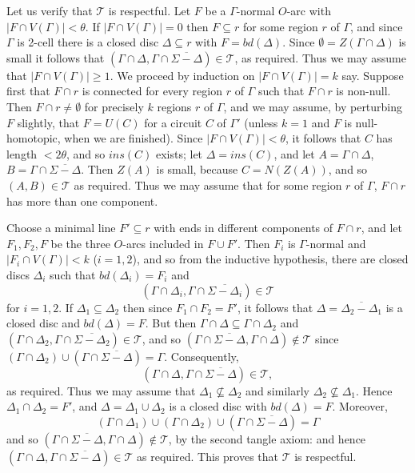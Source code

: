 Let us verify that $\mathscr{T}$ is respectful. Let $F$ be a $\Gamma$-normal $O$-arc with $|F \cap V(\Gamma)| < \theta$. If $|F \cap V(\Gamma)| = 0$ then $F \subseteq r$ for some region $r$ of $\Gamma$, and since $\Gamma$ is 2-cell there is a closed disc $\Delta \subseteq r$ with $F = bd(\Delta)$. Since $\emptyset = Z(\Gamma \cap \Delta)$ is small it follows that $(\Gamma \cap \Delta, \Gamma \cap \overline{\Sigma - \Delta}) \in \mathscr{T}$, as required. Thus we may assume that $|F \cap V(\Gamma)| \ge 1$. We proceed by induction on $|F \cap V(\Gamma)| = k$ say. Suppose first that $F \cap r$ is connected for every region $r$ of $\Gamma$ such that $F \cap r$ is non-null. Then $F \cap r \ne \emptyset$ for precisely $k$ regions $r$ of $\Gamma$, and we may assume, by perturbing $F$ slightly, that $F = U(C)$ for a circuit $C$ of $\Gamma'$ (unless $k = 1$ and $F$ is null-homotopic, when we are finished). Since $|F \cap V(\Gamma)| < \theta$, it follows that $C$ has length $< 2\theta$, and so $ins(C)$ exists; let $\Delta = ins(C)$, and let $A = \Gamma \cap \Delta$, $B = \Gamma \cap \overline{\Sigma - \Delta}$. Then $Z(A)$ is small, because $C = N(Z(A))$, and so $(A, B) \in \mathscr{T}$ as required. Thus we may assume that for some region $r$ of $\Gamma$, $F \cap r$ has more than one component.

Choose a minimal line $F' \subseteq r$ with ends in different components of $F \cap r$, and let $F_1, F_2, F$ be the three $O$-arcs included in $F \cup F'$. Then $F_i$ is $\Gamma$-normal and $|F_i \cap V(\Gamma)| < k$ ($i = 1, 2$), and so from the inductive hypothesis, there are closed discs $\Delta_i$ such that $bd(\Delta_i) = F_i$ and
\begin{equation*}
(\Gamma \cap \Delta_i, \Gamma \cap \overline{\Sigma - \Delta_i}) \in \mathscr{T}
\end{equation*}
for $i = 1, 2$. If $\Delta_1 \subseteq \Delta_2$ then since $F_1 \cap F_2 = F'$, it follows that $\Delta = \overline{\Delta_2 - \Delta_1}$ is a closed disc and $bd(\Delta) = F$. But then $\Gamma \cap \Delta \subseteq \Gamma \cap \Delta_2$ and $(\Gamma \cap \Delta_2, \Gamma \cap \overline{\Sigma - \Delta_2}) \in \mathscr{T}$, and so $(\Gamma \cap \overline{\Sigma - \Delta}, \Gamma \cap \Delta) \notin \mathscr{T}$ since $(\Gamma \cap \Delta_2) \cup (\Gamma \cap \overline{\Sigma - \Delta}) = \Gamma$. Consequently,
\begin{equation*}
(\Gamma \cap \Delta, \Gamma \cap \overline{\Sigma - \Delta}) \in \mathscr{T},
\end{equation*}
as required. Thus we may assume that $\Delta_1 \not\subseteq \Delta_2$ and similarly $\Delta_2 \not\subseteq \Delta_1$. Hence $\Delta_1 \cap \Delta_2 = F'$, and $\Delta = \Delta_1 \cup \Delta_2$ is a closed disc with $bd(\Delta) = F$. Moreover,
\begin{equation*}
(\Gamma \cap \Delta_1) \cup (\Gamma \cap \Delta_2) \cup (\Gamma \cap \overline{\Sigma - \Delta}) = \Gamma
\end{equation*}
and so $(\Gamma \cap \overline{\Sigma - \Delta}, \Gamma \cap \Delta) \notin \mathscr{T}$, by the second tangle axiom: and hence $(\Gamma \cap \Delta, \Gamma \cap \overline{\Sigma - \Delta}) \in \mathscr{T}$ as required. This proves that $\mathscr{T}$ is respectful.

